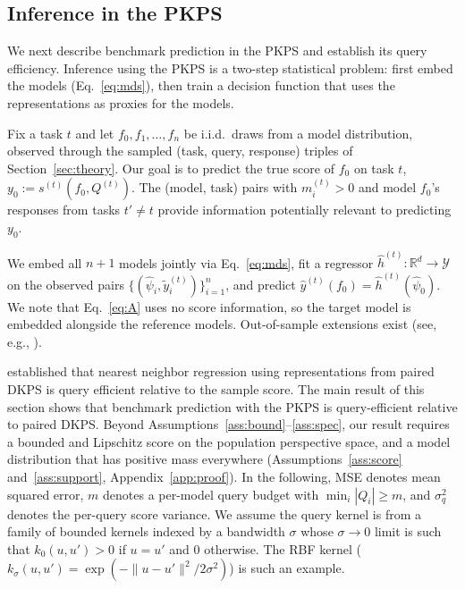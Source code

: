 \documentclass{article}
\theoremstyle{definition}
\theoremstyle{remark}
\theoremstyle{plain}
\newcommand{\PKPS}{PKPS\xspace}
\begin{document}
\subsection{Inference in the \PKPS}
\label{sec:qeff}
We next describe benchmark prediction in the \PKPS and establish its query
efficiency.
Inference using the \PKPS is a two-step statistical problem: first embed the
models (Eq.~\eqref{eq:mds}), then train a decision function that uses the
representations as proxies for the models.

Fix a task $t$ and let $f_{0},f_{1},\hdots,f_{n}$ be i.i.d.\ draws from a model
distribution, observed through the sampled (task, query, response) triples of
Section~\ref{sec:theory}.
Our goal is to predict the true score of $f_{0}$ on task $t$,
$y_{0}:=s^{(t)}(f_{0},Q^{(t)})$.
The (model, task) pairs with $m_{i}^{(t)}>0$ and model $ f_{0}$'s responses from tasks $ t' \neq t $ provide information potentially
relevant to predicting $y_{0}$.

We embed all $n{+}1$ models jointly via Eq.~\eqref{eq:mds}, fit a regressor $\hat h^{(t)}:\mathbb{R}^{d}\to\mathcal{Y}$ on
the observed pairs $\{(\hat\psi_{i},\tilde{y}_{i}^{(t)})\}_{i=1}^{n}$, and
predict $\hat y^{(t)}(f_{0})=\hat h^{(t)}(\hat\psi_{0})$.
We note that Eq.~\eqref{eq:A} uses no
score information, so the target model is embedded alongside the reference models.
Out-of-sample extensions exist (see, e.g., \citealp{trosset2008out, 10.3389/fnhum.2022.930291}).

\citet{dkps_qeff} established that nearest neighbor regression using representations
from paired DKPS is query efficient relative to the sample score.
The main result of this section shows that benchmark prediction with the \PKPS is
query-efficient relative to paired DKPS.
Beyond Assumptions~\ref{ass:bound}--\ref{ass:spec}, our result requires a bounded
and Lipschitz score on the population perspective space, and a model
distribution that has positive mass everywhere (Assumptions~\ref{ass:score} and~\ref{ass:support},
Appendix~\ref{app:proof}).
In the following, MSE denotes mean squared error,
$m$ denotes a per-model query budget with $\min_{i}|Q_{i}|\ge m$, and $\sigma_q^2$
denotes the per-query score variance.
We assume the query kernel is from a family
of bounded kernels indexed by a bandwidth $\sigma$ whose
$\sigma\to0$ limit is such that $ k_{0}(u, u') > 0 $ if $ u = u' $ and $ 0 $ otherwise. The RBF kernel ($k_{\sigma}(u,u')=\exp(-\|u-u'\|^{2}/2\sigma^{2})$) is
such an example.
\end{document}
